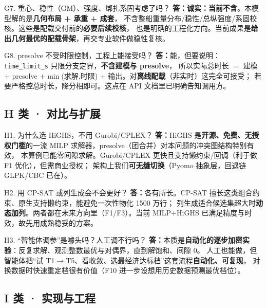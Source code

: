 \documentclass[11pt]{ctexart}
\newcommand{\code}[1]{\texttt{#1}}
\newcommand{\A}{\textbf{答：}}
\begin{document}
\begin{qa}{G7. 重心、稳性（GM）、强度、绑扎系固考虑了吗？}
\A \textbf{诚实：当前不含}。本模型解的是\textbf{几何布局 + 承重 + 成套}，
不含整船重量分布/稳性/总纵强度/系固校核。这些是配载交付前的\textbf{必要后续校核}，
也是明确的工程化方向。当前成果是\textbf{给出几何最优的配载骨架}，再交专业软件做稳性复核。
\end{qa}

\begin{qa}{G8. presolve 不受时限控制，工程上能接受吗？}
\A 能，但要说明：\code{time\_limit\_s} 只限分支定界，\textbf{不含建模与 presolve}，
所以实际总时长 $=$ 建模 $+$ presolve $+\min$(求解,时限) $+$ 输出。对\textbf{离线配载}（非实时）这完全可接受；
若要严格控总时长，降分相即可。这点在 API 文档里已明确告知调用方。
\end{qa}

\subsection{H 类 · 对比与扩展}

\begin{qa}{H1. 为什么选 HiGHS，不用 Gurobi/CPLEX？}
\A HiGHS 是\textbf{开源、免费、无授权门槛}的一流 MILP 求解器，presolve（团合并）对本问题的冲突图结构特别有效，
本算例已能零间隙求解。Gurobi/CPLEX 更快且支持懒约束/回调（利于做 F1 优化），但需商业授权；
架构上我们\textbf{可无缝切换}（Pyomo 抽象层，回退链 GLPK/CBC 已在）。
\end{qa}

\begin{qa}{H2. 用 CP-SAT 或列生成会不会更好？}
\A 各有所长。CP-SAT 擅长这类组合约束、原生支持懒约束，能避免一次性物化 1500 万行；
列生成适合候选集超大时\textbf{动态加列}。两者都在未来方向里（F1/F3）。当前 MILP+HiGHS 已满足精度与时效，故先用成熟稳妥的方案。
\end{qa}

\begin{qa}{H3. “智能体调参”是噱头吗？人工调不行吗？}
\A 本质是\textbf{自动化的逐步加密实验}：反复求解、观测整数最优与对偶界，直到解饱和、间隙 0。
人工也能做，但智能体把“试 T1$\to$T5、看收敛、选最经济达标档”这套流程\textbf{自动化、可复现}，
对换数据时快速重定档很有价值（F10 进一步设想用历史数据预测最优档位）。
\end{qa}

\subsection{I 类 · 实现与工程}
\end{document}
